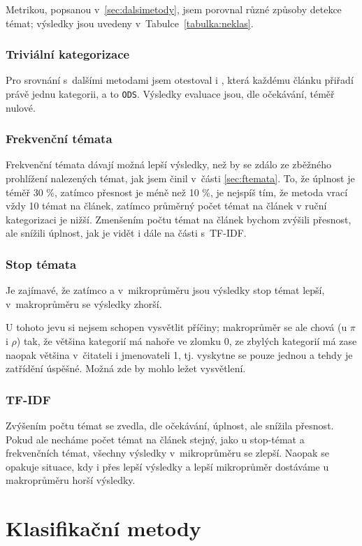 \documentclass[12pt,a4paper]{report}
\begin{document}
Metrikou, popsanou v~\ref{sec:dalsimetody}, jsem porovnal různé způsoby detekce témat; výsledky jsou uvedeny v~Tabulce~\ref{tabulka:neklas}.

\subsubsection{Triviální kategorizace}
Pro srovnání s~dalšími metodami jsem otestoval i , která každému článku přiřadí právě jednu kategorii, a to \texttt{ODS}. Výsledky evaluace jsou, dle očekávání, téměř nulové.

\subsubsection{Frekvenční témata}
Frekvenční témata dávají možná lepší výsledky, než by se zdálo ze zběžného prohlížení nalezených témat, jak jsem činil v~části \ref{sec:ftemata}. To, že úplnost je téměř 30 \%, zatímco přesnost je méně než 10 \%, je nejspíš tím, že metoda vrací vždy 10 témat na článek, zatímco průměrný počet témat na článek v ruční kategorizaci je nižší. Zmenšením počtu témat na článek bychom zvýšili přesnost, ale snížili úplnost, jak je vidět i dále na části s~TF-IDF.

\subsubsection{Stop témata}
Je zajímavé, že zatímco  a v~mikroprůměru jsou výsledky stop témat lepší, v~makroprůměru se výsledky zhorší.

 U tohoto jevu si nejsem schopen vysvětlit příčiny; makroprůměr se ale chová (u $\pi$ i $\rho$) tak, že většina kategorií má nahoře ve zlomku 0, ze zbylých kategorií má zase naopak většina v~čitateli i jmenovateli 1, tj. vyskytne se pouze jednou a tehdy je zatřídění úspěšné. Možná zde by mohlo ležet vysvětlení.

\subsubsection{TF-IDF}
Zvýšením počtu témat se zvedla, dle očekávání, úplnost, ale snížila přesnost. Pokud ale necháme počet témat na článek stejný, jako u stop-témat a frekvenčních témat, všechny výsledky v~mikroprůměru se zlepší. Naopak se opakuje situace, kdy i přes  lepší výsledky a lepší mikroprůměr dostáváme u makroprůměru horší výsledky.

\section{Klasifikační metody}
\end{document}
